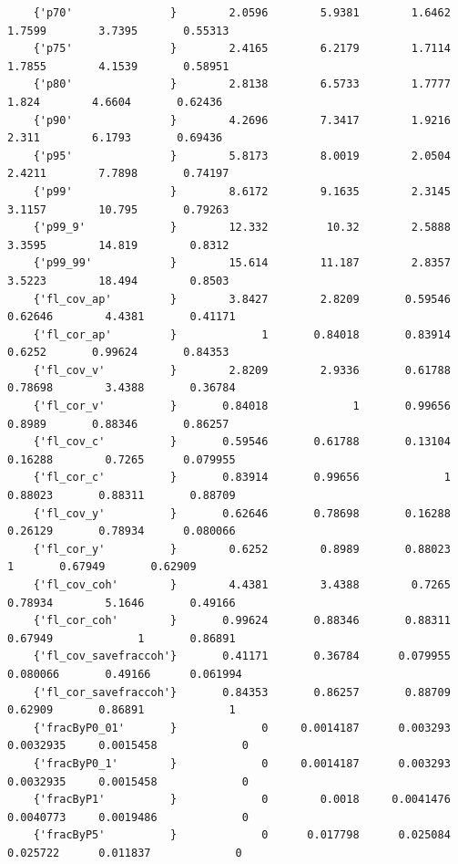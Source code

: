 \documentclass[
]{book}
\begin{document}
\begin{verbatim}
    {'p70'               }        2.0596        5.9381        1.6462        1.7599        3.7395       0.55313 
    {'p75'               }        2.4165        6.2179        1.7114        1.7855        4.1539       0.58951 
    {'p80'               }        2.8138        6.5733        1.7777         1.824        4.6604       0.62436 
    {'p90'               }        4.2696        7.3417        1.9216         2.311        6.1793       0.69436 
    {'p95'               }        5.8173        8.0019        2.0504        2.4211        7.7898       0.74197 
    {'p99'               }        8.6172        9.1635        2.3145        3.1157        10.795       0.79263 
    {'p99_9'             }        12.332         10.32        2.5888        3.3595        14.819        0.8312 
    {'p99_99'            }        15.614        11.187        2.8357        3.5223        18.494        0.8503 
    {'fl_cov_ap'         }        3.8427        2.8209       0.59546       0.62646        4.4381       0.41171 
    {'fl_cor_ap'         }             1       0.84018       0.83914        0.6252       0.99624       0.84353 
    {'fl_cov_v'          }        2.8209        2.9336       0.61788       0.78698        3.4388       0.36784 
    {'fl_cor_v'          }       0.84018             1       0.99656        0.8989       0.88346       0.86257 
    {'fl_cov_c'          }       0.59546       0.61788       0.13104       0.16288        0.7265      0.079955 
    {'fl_cor_c'          }       0.83914       0.99656             1       0.88023       0.88311       0.88709 
    {'fl_cov_y'          }       0.62646       0.78698       0.16288       0.26129       0.78934      0.080066 
    {'fl_cor_y'          }        0.6252        0.8989       0.88023             1       0.67949       0.62909 
    {'fl_cov_coh'        }        4.4381        3.4388        0.7265       0.78934        5.1646       0.49166 
    {'fl_cor_coh'        }       0.99624       0.88346       0.88311       0.67949             1       0.86891 
    {'fl_cov_savefraccoh'}       0.41171       0.36784      0.079955      0.080066       0.49166      0.061994 
    {'fl_cor_savefraccoh'}       0.84353       0.86257       0.88709       0.62909       0.86891             1 
    {'fracByP0_01'       }             0     0.0014187      0.003293     0.0032935     0.0015458             0 
    {'fracByP0_1'        }             0     0.0014187      0.003293     0.0032935     0.0015458             0 
    {'fracByP1'          }             0        0.0018     0.0041476     0.0040773     0.0019486             0 
    {'fracByP5'          }             0      0.017798      0.025084      0.025722      0.011837             0 

\end{verbatim}
\end{document}
